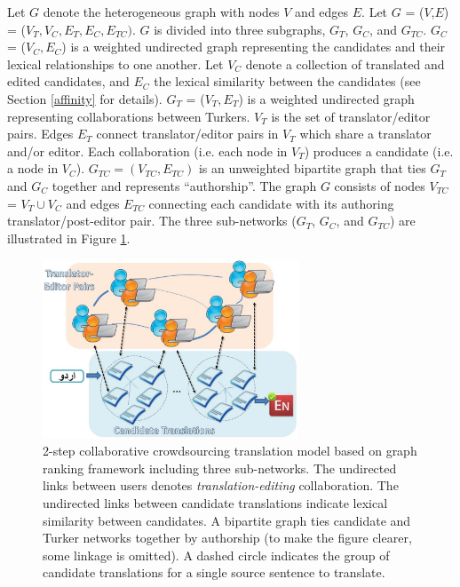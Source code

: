 \documentclass[11pt]{article}
\begin{document}
Let $G$ denote the heterogeneous graph with nodes $V$ and edges $E$. Let $G$ = ($V$,$E$) = ($V_T, V_C, E_T, E_C, E_{TC})$. $G$ is divided into three subgraphs, $G_T$, $G_C$, and $G_{TC}$. $G_C$ = ($V_C,E_C$) is a weighted undirected graph representing the candidates and their lexical relationships to one another. Let $V_C$ denote a collection of translated and edited candidates, and $E_C$ the lexical similarity between the candidates (see Section \ref{affinity} for details). $G_T$ = ($V_T,E_T$) is a weighted undirected graph representing collaborations between Turkers. $V_T$ is the set of translator/editor pairs. Edges $E_T$ connect translator/editor pairs in $V_T$ which share a translator and/or editor. Each collaboration (i.e. each node in $V_T$) produces a candidate (i.e. a node in $V_C$). $G_{TC} = (V_{TC},E_{TC})$ is an unweighted bipartite graph that ties $G_T$ and $G_C$ together and represents ``authorship''. The graph $G$ consists of nodes $V_{TC}$ = $V_T \cup V_C$ and edges $E_{TC}$ connecting each candidate with its authoring translator/post-editor pair. The three sub-networks ($G_T$, $G_C$, and $G_{TC}$) are illustrated in Figure \ref{frame}.

\begin{figure}[t]
  \centering
  \includegraphics[width=0.68\textwidth]{framework}
  \caption{2-step collaborative crowdsourcing translation model based on graph ranking framework including three sub-networks. The undirected links between users denotes \textit{translation-editing} collaboration. The undirected links between candidate translations indicate lexical similarity between candidates. A bipartite graph ties candidate and Turker networks together by authorship (to make the figure clearer, some linkage is omitted). A dashed circle indicates the group of candidate translations for a single source sentence to translate.}
  \label{frame}
\end{figure}
\end{document}
